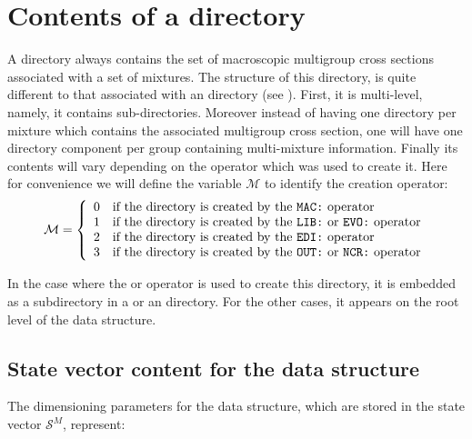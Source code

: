 \section{Contents of a  directory}\label{sect:macrolibdir}

A  directory always contains the set of macroscopic multigroup cross
sections associated with a set of mixtures. The structure of this directory,
is quite different to that associated with an  directory (see
). First, it is multi-level, namely, it contains sub-directories.
Moreover instead of having one directory per mixture which contains the
associated multigroup cross section, one will have one directory component per group containing
multi-mixture information. Finally its contents will vary depending on the operator
which was used to create it. Here for convenience we will define the variable $\mathcal{M}$ to
identify the creation operator:
\begin{displaymath}
\mathcal{M} = \left\{
\begin{array}{ll}
0 & \textrm{if the directory is created by the \moc{MAC:} operator}\\
1 & \textrm{if the directory is created by the \moc{LIB:} or \moc{EVO:} operator}\\
2 & \textrm{if the directory is created by the \moc{EDI:} operator}\\
3 & \textrm{if the directory is created by the \moc{OUT:} or \moc{NCR:} operator}
\end{array} \right.
\end{displaymath}

In the case where the  or  operator is used to create this directory,
it is embedded as a subdirectory in a  or an  directory.
For the other cases, it appears on the root level of the  data structure.

\subsection{State vector content for the  data structure}\label{sect:macrolibstate}

The dimensioning parameters for the  data structure, which are stored in
the state vector $\mathcal{S}^{M}$, represent:

